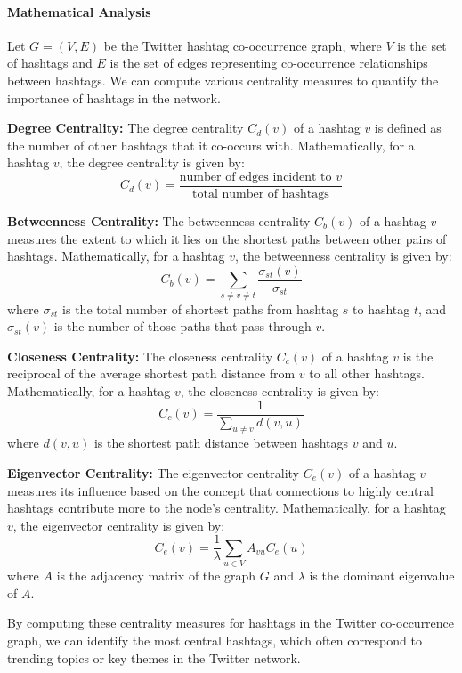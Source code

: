 \documentclass[12pt]{book} %
\begin{document}
\paragraph{Mathematical Analysis}

Let \(G = (V, E)\) be the Twitter hashtag co-occurrence graph, where \(V\) is the set of hashtags and \(E\) is the set of edges representing co-occurrence relationships between hashtags. We can compute various centrality measures to quantify the importance of hashtags in the network.

\textbf{Degree Centrality:} The degree centrality \(C_d(v)\) of a hashtag \(v\) is defined as the number of other hashtags that it co-occurs with. Mathematically, for a hashtag \(v\), the degree centrality is given by:
\[ C_d(v) = \frac{\text{number of edges incident to } v}{\text{total number of hashtags}} \]

\textbf{Betweenness Centrality:} The betweenness centrality \(C_b(v)\) of a hashtag \(v\) measures the extent to which it lies on the shortest paths between other pairs of hashtags. Mathematically, for a hashtag \(v\), the betweenness centrality is given by:
\[ C_b(v) = \sum_{s \neq v \neq t} \frac{\sigma_{st}(v)}{\sigma_{st}} \]
where \(\sigma_{st}\) is the total number of shortest paths from hashtag \(s\) to hashtag \(t\), and \(\sigma_{st}(v)\) is the number of those paths that pass through \(v\).

\textbf{Closeness Centrality:} The closeness centrality \(C_c(v)\) of a hashtag \(v\) is the reciprocal of the average shortest path distance from \(v\) to all other hashtags. Mathematically, for a hashtag \(v\), the closeness centrality is given by:
\[ C_c(v) = \frac{1}{\sum_{u \neq v} d(v, u)} \]
where \(d(v, u)\) is the shortest path distance between hashtags \(v\) and \(u\).

\textbf{Eigenvector Centrality:} The eigenvector centrality \(C_e(v)\) of a hashtag \(v\) measures its influence based on the concept that connections to highly central hashtags contribute more to the node's centrality. Mathematically, for a hashtag \(v\), the eigenvector centrality is given by:
\[ C_e(v) = \frac{1}{\lambda} \sum_{u \in V} A_{vu} C_e(u) \]
where \(A\) is the adjacency matrix of the graph \(G\) and \(\lambda\) is the dominant eigenvalue of \(A\).

By computing these centrality measures for hashtags in the Twitter co-occurrence graph, we can identify the most central hashtags, which often correspond to trending topics or key themes in the Twitter network.
\end{document}
